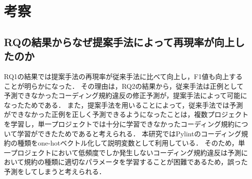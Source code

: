 \documentclass[submit,noauthor,ses,dvipdfmx]{ipsj}
\begin{document}


\section{考察}\label{chap:consideration}

\subsection{RQの結果からなぜ提案手法によって再現率が向上したのか}\label{kosatu}

RQ1の結果では提案手法の再現率が従来手法に比べて向上し，F1値も向上することが明らかになった．
その理由は，RQ2の結果から，従来手法は正例として予測できなかったコーディング規約違反の修正予測が，提案手法によって可能になったためである．
また，提案手法を用いることによって，従来手法では予測ができなかった正例を正しく予測できるようになったことは，複数プロジェクトを学習し，単一プロジェクトでは十分に学習できなかったコーディング規約について学習ができたためであると考えられる．
本研究ではPylintのコーディング規約の種類をone-hotベクトル化して説明変数として利用している．
そのため，単一プロジェクトにおいて低頻度でしか発生しないコーディング規約違反は予測において規約の種類に適切なパラメータを学習することが困難であるため，誤った予測をしてしまうと考えられる．
\end{document}
